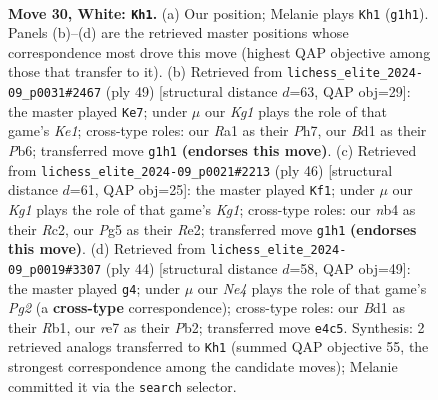 \documentclass[11pt]{article}
\begin{document}
\clearpage

\begin{figure}[p]\centering
\begin{subfigure}{0.46\textwidth}\centering
\resizebox{\linewidth}{!}{%
\newchessgame
\chessboard[
  setfen={r5k1/4rppp/1n2p3/pb4P1/1n2N3/1P2P2R/P5PP/RN1B2K1 w - - 9 30},
  showmover=false,
  pgfstyle=straightmove, color=movearrow, markmove={g1-h1}
]}
\caption{}
\end{subfigure}\hfill
\begin{subfigure}{0.46\textwidth}\centering
\resizebox{\linewidth}{!}{%
\newchessgame
\chessboard[
  setfen={4k3/r2p1p1p/ppr1pp2/8/P1P5/1P2P3/3R1PPP/3R2K1 b - - 0 25},
  showmover=false,
  pgfstyle=straightmove, color=movearrow, markmove={e8-e7}
]}
\caption{}
\end{subfigure}
\\[4pt]
\begin{subfigure}{0.46\textwidth}\centering
\resizebox{\linewidth}{!}{%
\newchessgame
\chessboard[
  setfen={6k1/r2nppb1/r2p2pp/2pP4/4P3/1P3N1P/P1R1RPP1/4B1K1 w - - 0 24},
  showmover=false,
  pgfstyle=straightmove, color=movearrow, markmove={g1-f1}
]}
\caption{}
\end{subfigure}\hfill
\begin{subfigure}{0.46\textwidth}\centering
\resizebox{\linewidth}{!}{%
\newchessgame
\chessboard[
  setfen={r3r1k1/1p3ppp/2p5/p2p1n2/P2P1P2/2NRP3/1P3KP1/1R6 w - - 1 23},
  showmover=false,
  pgfstyle=straightmove, color=movearrow, markmove={g2-g4}
]}
\caption{}
\end{subfigure}
\caption{\textbf{Move 30, White: \texttt{Kh1}.} (a) Our position; Melanie plays \texttt{Kh1} (\texttt{g1h1}). Panels (b)--(d) are the retrieved master positions whose correspondence most drove this move (highest QAP objective among those that transfer to it). (b) Retrieved from \texttt{lichess\_elite\_2024-09\_p0031\#2467} (ply 49) [structural distance $d$=63, QAP obj=29]: the master played \texttt{Ke7}; under $\mu$ our \emph{Kg1} plays the role of that game's \emph{Ke1}; cross-type roles: our \emph{R}a1 as their \emph{P}h7, our \emph{B}d1 as their \emph{P}b6; transferred move \texttt{g1h1} \textbf{(endorses this move)}. (c) Retrieved from \texttt{lichess\_elite\_2024-09\_p0021\#2213} (ply 46) [structural distance $d$=61, QAP obj=25]: the master played \texttt{Kf1}; under $\mu$ our \emph{Kg1} plays the role of that game's \emph{Kg1}; cross-type roles: our \emph{n}b4 as their \emph{R}c2, our \emph{P}g5 as their \emph{R}e2; transferred move \texttt{g1h1} \textbf{(endorses this move)}. (d) Retrieved from \texttt{lichess\_elite\_2024-09\_p0019\#3307} (ply 44) [structural distance $d$=58, QAP obj=49]: the master played \texttt{g4}; under $\mu$ our \emph{Ne4} plays the role of that game's \emph{Pg2} (a \textbf{cross-type} correspondence); cross-type roles: our \emph{B}d1 as their \emph{R}b1, our \emph{r}e7 as their \emph{P}b2; transferred move \texttt{e4c5}. Synthesis: 2 retrieved analogs transferred to \texttt{Kh1} (summed QAP objective 55, the strongest correspondence among the candidate moves); Melanie committed it via the \texttt{search} selector.}
\label{fig:thought-m58}
\end{figure}
\end{document}
